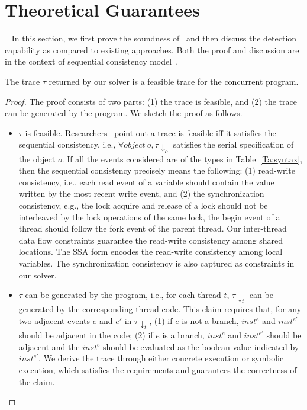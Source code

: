\section{Theoretical Guarantees}~\label{sec:guarantee}
In this section, we first prove the soundness of \tool\ and then discuss the detection capability as compared to existing approaches.
Both the proof and discussion are in the context of sequential consistency model~\cite{scmodel}.

\begin{mytheorem}[Soundness]
The trace $\tau$ returned by our solver is a feasible trace for the concurrent program.
\end{mytheorem}

\begin{proof}
The proof consists of two parts: (1) the trace is feasible, and (2) the trace can be generated by the program. We sketch the proof as follows.
\begin{itemize}
\item  $\tau$ is feasible. Researchers~\cite{chao,maximal} point out a trace is feasible iff it satisfies the sequential consistency, i.e., $\forall object\ o, \tau\downarrow_{o}$ satisfies the serial specification of the object $o$. If  all the events considered are of the types in Table~\ref{Ta:syntax}, then the sequential consistency precisely means the following: (1) read-write consistency, i.e., each read event of a variable should contain the value written by the most recent write event, and (2) the synchronization consistency, e.g., the lock acquire and release of a lock should not be interleaved by the lock operations of the same lock, the begin event of a thread should follow the fork event of the parent thread. Our inter-thread data flow constraints guarantee the read-write consistency among shared locations. The SSA form encodes the read-write consistency among local variables. The synchronization consistency is also captured as constraints in our solver. 
\item $\tau$ can be generated by the program, i.e., for each thread $t$, $\tau\downarrow_{t}$ can be generated by the corresponding thread code.
This claim requires that,  for any two adjacent events $e$ and $e'$ in  $\tau\downarrow_{t}$, (1) if $e$ is not a branch, $inst^e$ and $inst^{e'}$ should be adjacent in the code; (2) if $e$ is a branch, $inst^e$ and $inst^{e'}$ should be adjacent and the $inst^e$ should be evaluated as the boolean value indicated by $inst^{e'}$. 
We derive the trace  through either concrete execution or symbolic execution, which satisfies the requirements and guarantees the correctness of the claim.
\end{itemize}
\end{proof}



